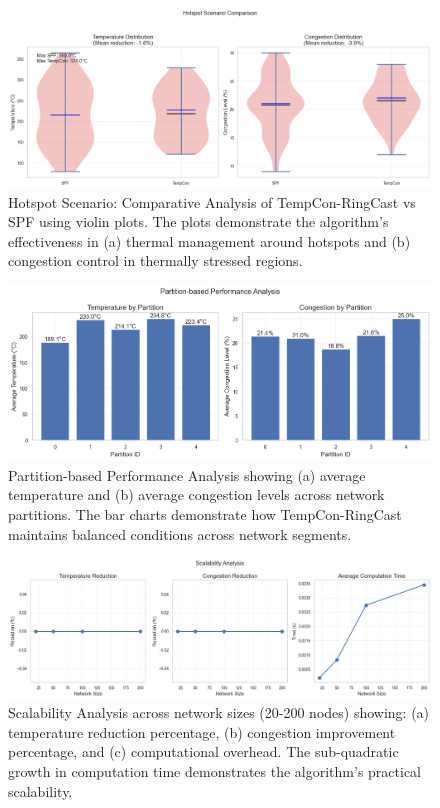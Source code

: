 \documentclass[conference]{IEEEtran}
\begin{document}
\begin{figure}[h]
    \centering
    \includegraphics[width=\linewidth]{hotspot_scenario_comparison.png}
    \caption{Hotspot Scenario: Comparative Analysis of TempCon-RingCast vs SPF using violin plots. The plots demonstrate the algorithm's effectiveness in (a) thermal management around hotspots and (b) congestion control in thermally stressed regions.}
    \label{fig:hotspot_scenario}
\end{figure}

\begin{figure}[h]
    \centering
    \includegraphics[width=\linewidth]{partition_analysis.png}
    \caption{Partition-based Performance Analysis showing (a) average temperature and (b) average congestion levels across network partitions. The bar charts demonstrate how TempCon-RingCast maintains balanced conditions across network segments.}
    \label{fig:partition_analysis}
\end{figure}

\begin{figure}[h]
    \centering
    \includegraphics[width=\linewidth]{scalability.png}
    \caption{Scalability Analysis across network sizes (20-200 nodes) showing: (a) temperature reduction percentage, (b) congestion improvement percentage, and (c) computational overhead. The sub-quadratic growth in computation time demonstrates the algorithm's practical scalability.}
    \label{fig:scalability}
\end{figure}
\end{document}
